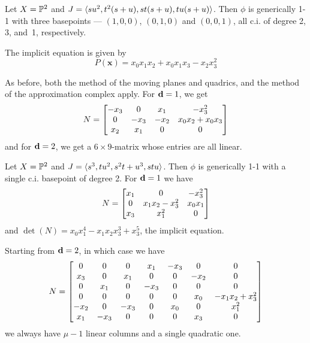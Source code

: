 \documentclass[fleqn,reqno]{amsart}
\numberwithin{first}{chapter}
\begin{document}
\begin{example}[$\mt{ex304}$]
\label{ex304}
Let $X=\mathbb{P}^2$ and $J=\langle su^2,t^2(s+u),st(s+u),tu(s+u)\rangle$.
Then $\phi$ is generically 1-1 with three basepoints --- $(1,0,0)$, $(0,1,0)$ and $(0,0,1)$,
all c.i. of degree 2, 3, and~1, respectively.

The implicit equation is given by
\[
	P(\mathbf x)={x}_{0} {x}_{1} {x}_{2}+{x}_{0} {x}_{1} {x}_{3}-{x}_{2} {x}_{3}^{2}
\]

As before, both the method of the moving planes and quadrics,
and the method of the approximation complex apply.
For $\mathbf d=1$, we get
\[
	N=
	\bgroup\begin{bmatrix}{-{x}_{3}}&
      0&
      {x}_{1}&
      {-{x}_{3}^{2}}\\
      0&
      {-{x}_{3}}&
      {-{x}_{2}}&
      {x}_{0} {x}_{2}+{x}_{0} {x}_{3}\\
      {x}_{2}&
      {x}_{1}&
      0&
      0\\
      \end{bmatrix}\egroup
\]
and for $\mathbf d=2$, we get a $6\times 9$-matrix whose entries are all linear.
\end{example}

\begin{example}[$\mt{ex305}$]
\label{ex305}
Let $X=\mathbb{P}^2$ and $J=\langle s^3,tu^2,s^2t+u^3,stu\rangle$.
Then $\phi$ is generically 1-1 with a single c.i. basepoint of degree 2.
For $\mathbf d=1$ we have
\[
	N=
	\bgroup\begin{bmatrix}{x}_{1}&
      0&
      {-{x}_{3}^{2}}\\
      0&
      {x}_{1} {x}_{2}-{x}_{3}^{2}&
      {x}_{0} {x}_{1}\\
      {{x}_{3}}&
      {x}_{1}^{2}&
      0\\
      \end{bmatrix}\egroup
\]
and $\det(N)={x}_{0} {x}_{1}^{4}-{x}_{1} {x}_{2} {x}_{3}^{3}+{x}_{3}^{5}$,
the implicit equation.

Starting from $\mathbf d=2$, in which case we have
\[
	N=
	\bgroup\begin{bmatrix}0&
      0&
      0&
      {x}_{1}&
      {-{x}_{3}}&
      0&
      0\\
      {x}_{3}&
      0&
      {x}_{1}&
      0&
      0&
      {-{x}_{2}}&
      0\\
      0&
      {x}_{1}&
      0&
      {-{x}_{3}}&
      0&
      0&
      0\\
      0&
      0&
      0&
      0&
      0&
      {x}_{0}&
      -{x}_{1} {x}_{2}+{x}_{3}^{2}\\
      {-{x}_{2}}&
      0&
      {-{x}_{3}}&
      0&
      {x}_{0}&
      0&
      {x}_{1}^{2}\\
      {x}_{1}&
      {-{x}_{3}}&
      0&
      0&
      0&
      {x}_{3}&
      0\\
      \end{bmatrix}\egroup
\]
we always have $\mu-1$ linear columns and a single quadratic one.
\end{example}
\end{document}
